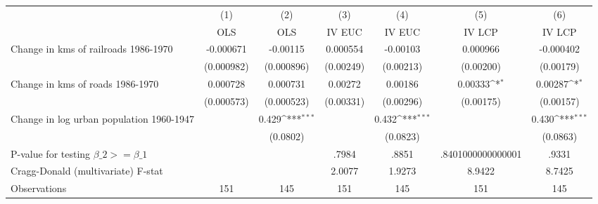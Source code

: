 {
\def\sym#1{\ifmmode^{#1}\else\(^{#1}\)\fi}
\begin{tabular}{l*{6}{c}}
\hline\hline
                &\multicolumn{1}{c}{(1)}&\multicolumn{1}{c}{(2)}&\multicolumn{1}{c}{(3)}&\multicolumn{1}{c}{(4)}&\multicolumn{1}{c}{(5)}&\multicolumn{1}{c}{(6)}\\
                &\multicolumn{1}{c}{OLS}&\multicolumn{1}{c}{OLS}&\multicolumn{1}{c}{IV EUC}&\multicolumn{1}{c}{IV EUC}&\multicolumn{1}{c}{IV LCP}&\multicolumn{1}{c}{IV LCP}\\
\hline
Change in kms of railroads 1986-1970&-0.000671         & -0.00115         & 0.000554         & -0.00103         & 0.000966         &-0.000402         \\
                &(0.000982)         &(0.000896)         &(0.00249)         &(0.00213)         &(0.00200)         &(0.00179)         \\
[1em]
Change in kms of roads 1986-1970& 0.000728         & 0.000731         &  0.00272         &  0.00186         &  0.00333\sym{*}  &  0.00287\sym{*}  \\
                &(0.000573)         &(0.000523)         &(0.00331)         &(0.00296)         &(0.00175)         &(0.00157)         \\
[1em]
Change in log urban population 1960-1947&                  &    0.429\sym{***}&                  &    0.432\sym{***}&                  &    0.430\sym{***}\\
                &                  & (0.0802)         &                  & (0.0823)         &                  & (0.0863)         \\
\hline
P-value for testing $\beta\_{2} >= \beta\_{1}$&                  &                  &    .7984         &    .8851         &.8401000000000001         &    .9331         \\
Cragg-Donald (multivariate) F-stat&                  &                  &   2.0077         &   1.9273         &   8.9422         &   8.7425         \\
Observations    &      151         &      145         &      151         &      145         &      151         &      145         \\
\hline\hline
\end{tabular}
}
